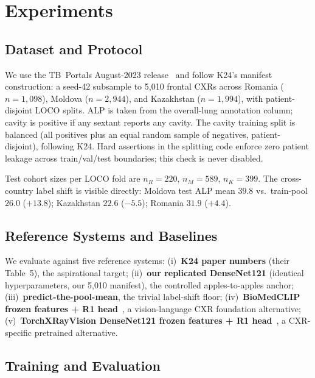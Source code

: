 \documentclass[runningheads]{llncs}
\begin{document}
\section{Experiments}

\subsection{Dataset and Protocol}

We use the TB~Portals August-2023 release~\cite{tbportals2020} and follow K24's manifest construction: a seed-42 subsample to 5{,}010 frontal CXRs across Romania ($n{=}1{,}098$), Moldova ($n{=}2{,}944$), and Kazakhstan ($n{=}1{,}994$), with patient-disjoint LOCO splits. ALP is taken from the overall-lung annotation column; cavity is positive if any sextant reports any cavity. The cavity training split is balanced (all positives plus an equal random sample of negatives, patient-disjoint), following K24. Hard assertions in the splitting code enforce zero patient leakage across train/val/test boundaries; this check is never disabled.

Test cohort sizes per LOCO fold are $n_R{=}220$, $n_M{=}589$, $n_K{=}399$. The cross-country label shift is visible directly: Moldova test ALP mean $39.8$ vs.\ train-pool $26.0$ ($+13.8$); Kazakhstan $22.6$ ($-5.5$); Romania $31.9$ ($+4.4$).

\subsection{Reference Systems and Baselines}

We evaluate against five reference systems: (i)~\textbf{K24 paper numbers} (their Table~5), the aspirational target; (ii)~\textbf{our replicated DenseNet121} (identical hyperparameters, our 5{,}010 manifest), the controlled apples-to-apples anchor; (iii)~\textbf{predict-the-pool-mean}, the trivial label-shift floor; (iv)~\textbf{BioMedCLIP frozen features + R1 head}~\cite{zhang2024biomedclip}, a vision-language CXR foundation alternative; (v)~\textbf{TorchXRayVision DenseNet121 frozen features + R1 head}~\cite{cohen2022torchxrayvision}, a CXR-specific pretrained alternative.

\subsection{Training and Evaluation}
\end{document}

